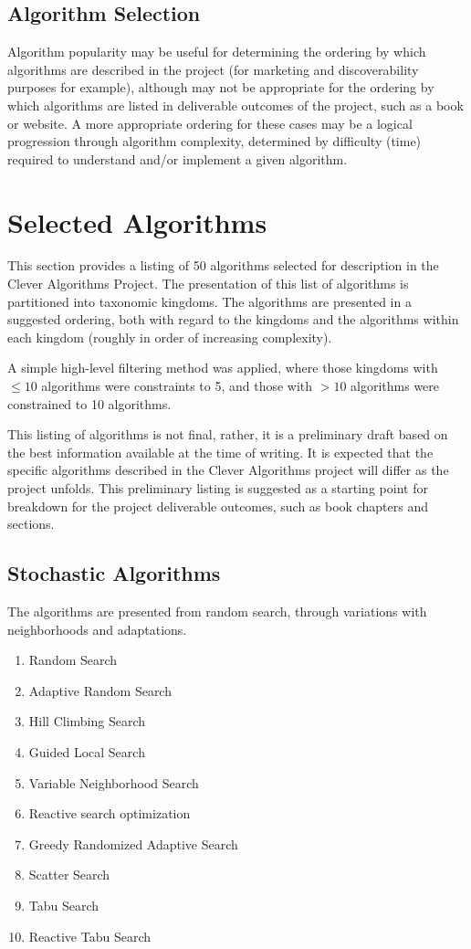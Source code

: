\documentclass[a4paper, 11pt]{article}
\begin{document}
\subsection{Algorithm Selection}
Algorithm popularity may be useful for determining the ordering by which algorithms are described in the project (for marketing and discoverability purposes for example), although may not be appropriate for the ordering by which algorithms are listed in deliverable outcomes of the project, such as a book or website. A more appropriate ordering for these cases may be a logical progression through algorithm complexity, determined by difficulty (time) required to understand and/or implement a given algorithm.  

% 
% 
\section{Selected Algorithms}
\label{sec:selection}
This section provides a listing of 50 algorithms selected for description in the Clever Algorithms Project. The presentation of this list of algorithms is partitioned into taxonomic kingdoms. The algorithms are presented in a suggested ordering, both with regard to the kingdoms and the algorithms within each kingdom (roughly in order of increasing complexity). 

A simple high-level filtering method was applied, where those kingdoms with $\leq 10$ algorithms were constraints to 5, and those with $>10$ algorithms were constrained to 10 algorithms.

This listing of algorithms is not final, rather, it is a preliminary draft based on the best information available at the time of writing. It is expected that the specific algorithms described in the Clever Algorithms project will differ as the project unfolds. This preliminary listing is suggested as a starting point for breakdown for the project deliverable outcomes, such as book chapters and sections.


\subsection{Stochastic Algorithms}
The algorithms are presented from random search, through variations with neighborhoods and adaptations. 

\begin{enumerate}
	\item Random Search
	\item Adaptive Random Search
	\item Hill Climbing Search
	\item Guided Local Search
	\item Variable Neighborhood Search
	\item Reactive search optimization
	\item Greedy Randomized Adaptive Search
	\item Scatter Search
	\item Tabu Search
	\item Reactive Tabu Search
\end{enumerate}
\end{document}
